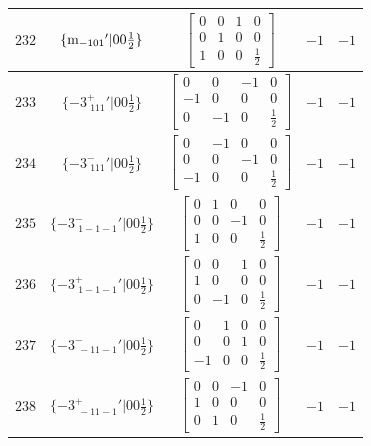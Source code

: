 \documentclass[fleqn,8pt]{jsarticle}
\begin{document}
\begin{longtable}{ccccc}
$ 232 $ & $ \{{\rm m}_{-101}{}'|0 0 \frac{1}{2}\} $ & $ \begin{bmatrix} 0 & 0 & 1 & 0 \\ 0 & 1 & 0 & 0 \\ 1 & 0 & 0 & \frac{1}{2} \end{bmatrix} $ & $ -1 $ & $ -1 $ \\ \hline
$ 233 $ & $ \{-3^{+}_{\,\,111}{}'|0 0 \frac{1}{2}\} $ & $ \begin{bmatrix} 0 & 0 & -1 & 0 \\ -1 & 0 & 0 & 0 \\ 0 & -1 & 0 & \frac{1}{2} \end{bmatrix} $ & $ -1 $ & $ -1 $ \\ \hline
$ 234 $ & $ \{-3^{-}_{\,\,111}{}'|0 0 \frac{1}{2}\} $ & $ \begin{bmatrix} 0 & -1 & 0 & 0 \\ 0 & 0 & -1 & 0 \\ -1 & 0 & 0 & \frac{1}{2} \end{bmatrix} $ & $ -1 $ & $ -1 $ \\ \hline
$ 235 $ & $ \{-3^{-}_{\,\,1-1-1}{}'|0 0 \frac{1}{2}\} $ & $ \begin{bmatrix} 0 & 1 & 0 & 0 \\ 0 & 0 & -1 & 0 \\ 1 & 0 & 0 & \frac{1}{2} \end{bmatrix} $ & $ -1 $ & $ -1 $ \\ \hline
$ 236 $ & $ \{-3^{+}_{\,\,1-1-1}{}'|0 0 \frac{1}{2}\} $ & $ \begin{bmatrix} 0 & 0 & 1 & 0 \\ 1 & 0 & 0 & 0 \\ 0 & -1 & 0 & \frac{1}{2} \end{bmatrix} $ & $ -1 $ & $ -1 $ \\ \hline
$ 237 $ & $ \{-3^{-}_{\,\,-11-1}{}'|0 0 \frac{1}{2}\} $ & $ \begin{bmatrix} 0 & 1 & 0 & 0 \\ 0 & 0 & 1 & 0 \\ -1 & 0 & 0 & \frac{1}{2} \end{bmatrix} $ & $ -1 $ & $ -1 $ \\ \hline
$ 238 $ & $ \{-3^{+}_{\,\,-11-1}{}'|0 0 \frac{1}{2}\} $ & $ \begin{bmatrix} 0 & 0 & -1 & 0 \\ 1 & 0 & 0 & 0 \\ 0 & 1 & 0 & \frac{1}{2} \end{bmatrix} $ & $ -1 $ & $ -1 $ \\ \hline

\end{longtable}
\end{document}

